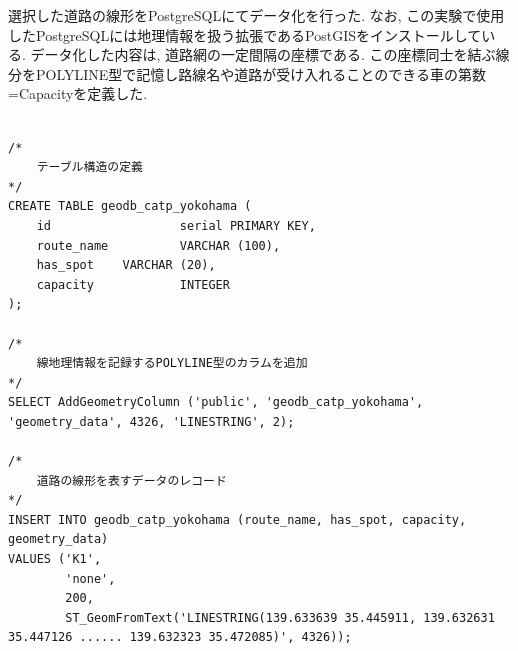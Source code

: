 選択した道路の線形をPostgreSQLにてデータ化を行った. なお, この実験で使用したPostgreSQLには地理情報を扱う拡張であるPostGISをインストールしている.
データ化した内容は, 道路網の一定間隔の座標である. この座標同士を結ぶ線分をPOLYLINE型で記憶し路線名や道路が受け入れることのできる車の第数=Capacityを定義した.

\begin{lstlisting}[caption = 路線データを表すクエリーの例, label = program1]

/*
    テーブル構造の定義
*/
CREATE TABLE geodb_catp_yokohama (
    id                  serial PRIMARY KEY,
    route_name          VARCHAR (100),
    has_spot    VARCHAR (20),
    capacity            INTEGER
);

/*
    線地理情報を記録するPOLYLINE型のカラムを追加
*/
SELECT AddGeometryColumn ('public', 'geodb_catp_yokohama', 'geometry_data', 4326, 'LINESTRING', 2);

/*
    道路の線形を表すデータのレコード
*/
INSERT INTO geodb_catp_yokohama (route_name, has_spot, capacity, geometry_data)
VALUES ('K1',
        'none',
        200,
        ST_GeomFromText('LINESTRING(139.633639 35.445911, 139.632631 35.447126 ...... 139.632323 35.472085)', 4326));
\end{lstlisting}

